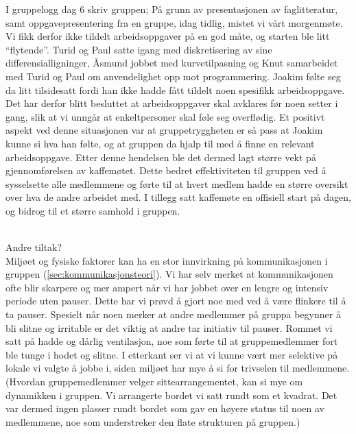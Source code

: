 I gruppelogg dag 6 skriv gruppen;
På grunn av presentasjonen av faglitteratur, samt oppgavepresentering fra en gruppe,
idag tidlig, mistet vi vårt morgenmøte. Vi fikk derfor ikke tildelt arbeidsoppgaver på                                                         
en god måte, og starten ble litt ``flytende''. Turid og Paul satte igang med diskretisering
av sine differensialligninger, Åsmund jobbet med kurvetilpasning og Knut samarbeidet
med Turid og Paul om anvendelighet opp mot programmering. Joakim følte seg da litt
tilsidesatt fordi han ikke hadde fått tildelt noen spesifikk arbeidsoppgave. Det har derfor
blitt besluttet at arbeidsoppgaver skal avklares før noen setter i gang, slik at vi unngår at                                           
enkeltpersoner skal føle seg overflødig. Et positivt aspekt ved denne situasjonen var at
gruppetryggheten er så pass at Joakim kunne si hva han følte, og at gruppen da hjalp til
med å finne en relevant arbeidsoppgave. Etter denne hendelsen ble det dermed lagt større vekt 
på gjennomførelsen av kaffemøtet. Dette bedret effektiviteten til gruppen ved å sysselsette 
alle medlemmene og førte til at hvert medlem hadde en større oversikt over hva de andre arbeidet
med. I tillegg satt kaffemøte en offisiell start på dagen, og bidrog til et større samhold i gruppen. \\\

Andre tiltak?\\

Miljøet og fysiske faktorer kan ha en stor innvirkning på kommunikasjonen i
gruppen (\ref{sec:kommunikasjonsteori}). Vi har selv
merket at kommunikasjonen ofte blir skarpere og mer ampert når vi har jobbet over en lengre og
intensiv periode uten pauser. Dette har vi prøvd å gjort noe med ved å være flinkere til å ta
pauser. Spesielt når noen merker at andre medlemmer på gruppa begynner å bli slitne og irritable
er det viktig at andre tar initiativ til pauser. Rommet vi satt på hadde og dårlig ventilasjon,
noe som førte til at gruppemedlemmer fort ble tunge i hodet og slitne. I etterkant ser vi at
vi kunne vært mer selektive på lokale vi valgte å jobbe i, siden miljøet har mye å si for 
trivselen til medlemmene.(Hvordan gruppemedlemmer velger sittearrangementet, kan si mye om 
dynamikken i gruppen. Vi arrangerte bordet vi satt rundt som et kvadrat. Det var dermed ingen
plasser rundt bordet som gav en høyere status til noen av medlemmene, noe som understreker den 
flate strukturen på gruppen.)\\

